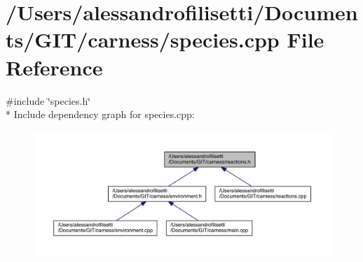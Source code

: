 \hypertarget{a00079}{\section{/\-Users/alessandrofilisetti/\-Documents/\-G\-I\-T/carness/species.cpp File Reference}
\label{a00079}
}
{\ttfamily \#include \char`\"{}species.\-h\char`\"{}}\\*
Include dependency graph for species.\-cpp\-:
\nopagebreak
\begin{figure}[H]
\begin{center}
\leavevmode
\includegraphics[width=350pt]{a00201}
\end{center}
\end{figure}
